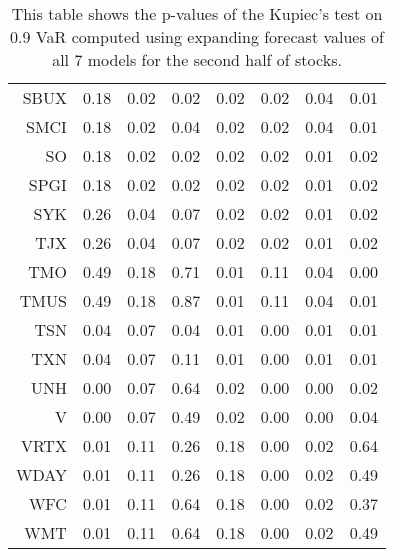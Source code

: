 \begin{table}[ht]
\begin{tabular}{rrrrrrrr}
  SBUX & 0.18 & 0.02 & 0.02 & 0.02 & 0.02 & 0.04 & 0.01 \\ 
  SMCI & 0.18 & 0.02 & 0.04 & 0.02 & 0.02 & 0.04 & 0.01 \\ 
  SO & 0.18 & 0.02 & 0.02 & 0.02 & 0.02 & 0.01 & 0.02 \\ 
  SPGI & 0.18 & 0.02 & 0.02 & 0.02 & 0.02 & 0.01 & 0.02 \\ 
  SYK & 0.26 & 0.04 & 0.07 & 0.02 & 0.02 & 0.01 & 0.02 \\ 
  TJX & 0.26 & 0.04 & 0.07 & 0.02 & 0.02 & 0.01 & 0.02 \\ 
  TMO & 0.49 & 0.18 & 0.71 & 0.01 & 0.11 & 0.04 & 0.00 \\ 
  TMUS & 0.49 & 0.18 & 0.87 & 0.01 & 0.11 & 0.04 & 0.01 \\ 
  TSN & 0.04 & 0.07 & 0.04 & 0.01 & 0.00 & 0.01 & 0.01 \\ 
  TXN & 0.04 & 0.07 & 0.11 & 0.01 & 0.00 & 0.01 & 0.01 \\ 
  UNH & 0.00 & 0.07 & 0.64 & 0.02 & 0.00 & 0.00 & 0.02 \\ 
  V & 0.00 & 0.07 & 0.49 & 0.02 & 0.00 & 0.00 & 0.04 \\ 
  VRTX & 0.01 & 0.11 & 0.26 & 0.18 & 0.00 & 0.02 & 0.64 \\ 
  WDAY & 0.01 & 0.11 & 0.26 & 0.18 & 0.00 & 0.02 & 0.49 \\ 
  WFC & 0.01 & 0.11 & 0.64 & 0.18 & 0.00 & 0.02 & 0.37 \\ 
  WMT & 0.01 & 0.11 & 0.64 & 0.18 & 0.00 & 0.02 & 0.49 \\ 
   \hline
\end{tabular}
\caption[Kupiec's test p-values, alpha =0.9 (2)]{This table shows the p-values of the Kupiec's test on 0.9 VaR computed using expanding forecast values of all 7 models for the second half of stocks.} 
\label{Table:Kupiec_test_expanding_0.9_2}
\end{table}
